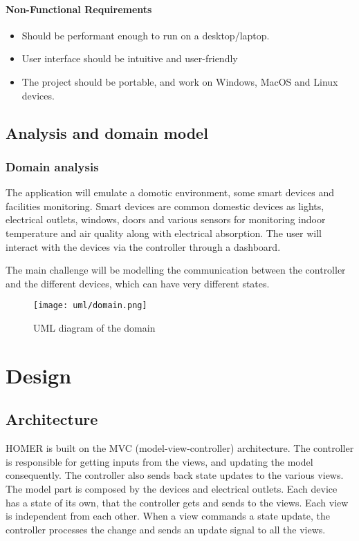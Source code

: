 \documentclass[a4paper,12pt]{report}
\begin{document}
\subsubsection{Non-Functional Requirements}

\begin{itemize}
	\item Should be performant enough to run on a desktop/laptop.
	\item User interface should be intuitive and user-friendly
	\item The project should be portable, and work on Windows, MacOS and Linux devices.
\end{itemize}

\section{Analysis and domain model}
\subsection[]{Domain analysis}

The application will emulate a domotic environment, some smart devices and facilities monitoring.
Smart devices are common domestic devices as lights, electrical outlets, windows, doors and various sensors 
for monitoring indoor temperature and air quality along with electrical absorption.
The user will interact with the devices via the controller through a dashboard.

The main challenge will be modelling the communication between the controller 
and the different devices, which can have very different states.

\begin{figure}[H]
\centering{}
\texttt{[image: uml/domain.png]}
\caption{UML diagram of the domain}
\label{uml:domain}
\end{figure}

\chapter{Design}
\section{Architecture}

HOMER is built on the MVC (model-view-controller) architecture. 
The controller is responsible for getting inputs from the views, and updating the model consequently.
The controller also sends back state updates to the various views.
The model part is composed by the devices and electrical outlets. Each device has a state of its own, that
the controller gets and sends to the views. 
Each view is independent from each other.
When a view commands a state update, the controller processes the change and sends an update signal to all the views.
\end{document}
